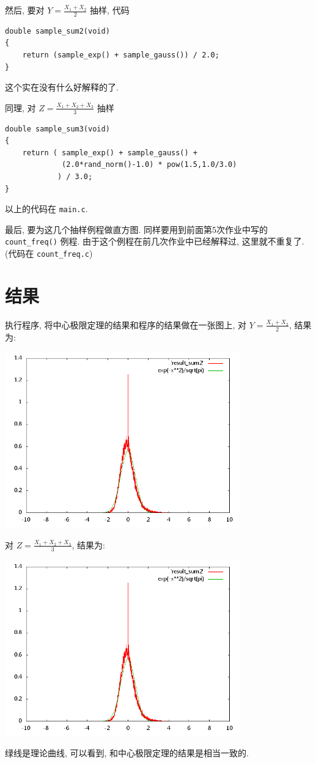 \documentclass{ctexart}
\begin{document}
然后, 要对 $Y = \frac{X_1+X_2}{2}$ 抽样, 代码
\begin{verbatim}
double sample_sum2(void)
{
    return (sample_exp() + sample_gauss()) / 2.0;
}
\end{verbatim}
这个实在没有什么好解释的了.

同理, 对 $Z = \frac{X_1+X_2+X_3}{3}$ 抽样
\begin{verbatim}
double sample_sum3(void)
{
    return ( sample_exp() + sample_gauss() +
             (2.0*rand_norm()-1.0) * pow(1.5,1.0/3.0)
            ) / 3.0;
}
\end{verbatim}

以上的代码在 \verb|main.c|.

最后, 要为这几个抽样例程做直方图. 同样要用到前面第5次作业中写的 \verb|count_freq()|
例程. 由于这个例程在前几次作业中已经解释过, 这里就不重复了. (代码在 \verb|count_freq.c|)

\section{结果}
执行程序, 将中心极限定理的结果和程序的结果做在一张图上, 对 $Y = \frac{X_1+X_2}{2}$,
结果为:
\begin{center}
\includegraphics[width=4in]{sum2.png}
\end{center}
对 $Z = \frac{X_1+X_2+X_3}{3}$, 结果为:
\begin{center}
\includegraphics[width=4in]{sum2.png}
\end{center}
绿线是理论曲线, 可以看到, 和中心极限定理的结果是相当一致的.
\end{document}
